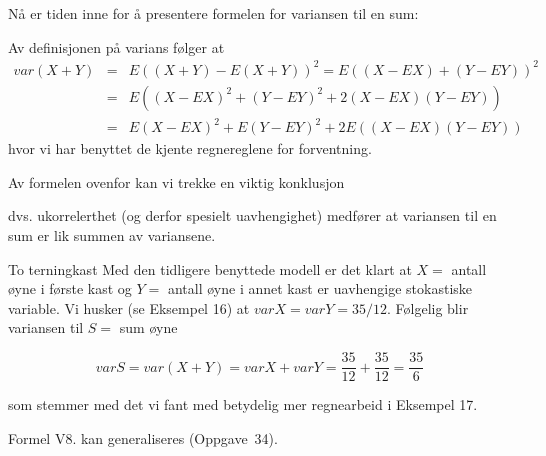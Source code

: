 Nå er tiden inne for å presentere formelen for variansen til en
sum:

\begin{center} \framebox[10cm]{\begin{minipage}{9cm}
\[ \mbox{\ \ \ V8. \ \ \ \ }var(X+Y)=varX+varY+2cov(X,Y) \]
\mbox{}\end{minipage}} \end{center}
 Av definisjonen på varians følger at
\begin{eqnarray*}
var(X+Y)&=&E((X+Y)-E(X+Y))^2=E((X-EX)+(Y-EY))^2 \\
         &=&E((X-EX)^2+(Y-EY)^2+2(X-EX)(Y-EY)) \\
         &=&E(X-EX)^2+E(Y-EY)^2+2E((X-EX)(Y-EY))
\end{eqnarray*}
\noindent hvor vi har benyttet de kjente regnereglene for forventning.

     Av formelen ovenfor kan vi trekke en viktig konklusjon
\begin{center} \framebox[10cm]{\begin{minipage}{9cm}
\[ \mbox{V9. \ }  var(X+Y)=varX+varY
              \mbox{ når $X$ og $Y$ er ukorrelerte} \]
\mbox{} \end{minipage}} \end{center}
\noindent dvs. ukorrelerthet (og derfor spesielt uavhengighet) medfører at
variansen til en sum er lik summen av variansene. \\

\begin{eksempel}{To terningkast}
Med den tidligere benyttede modell er det klart at $X=$ antall
øyne i første kast og $Y=$ antall øyne i annet kast er uavhengige
stokastiske variable. Vi husker (se Eksempel 16) at
$varX=varY=35/12$. Følgelig blir variansen til $S=$ sum øyne

\[ varS=var(X+Y)=varX+varY=\frac{35}{12}+\frac{35}{12}=\frac{35}{6} \]

\noindent som stemmer med det vi fant med betydelig mer regnearbeid i
Eksempel 17.
\end{eksempel}

Formel V8. kan generaliseres (Oppgave~34).

\begin{center} \framebox[10cm]{\begin{minipage}{9cm}
\[ \mbox{\ \ \ V10. \ \ \ \ } var(\sum_{i=1}^n X_i)= \sum_{i=1}^n var(X_i)
             + \sum_{i \ne j}cov(X_i,X_j)   \]
\mbox{} \end{minipage}} \end{center}

